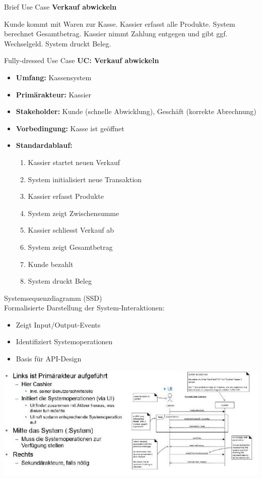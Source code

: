 \begin{example2}{Brief Use Case}
\textbf{Verkauf abwickeln}

Kunde kommt mit Waren zur Kasse. Kassier erfasst alle Produkte. System berechnet Gesamtbetrag. Kassier nimmt Zahlung entgegen und gibt ggf. Wechselgeld. System druckt Beleg.
\end{example2}

\begin{example2}{Fully-dressed Use Case}
\textbf{UC: Verkauf abwickeln}
\begin{itemize}
    \item \textbf{Umfang:} Kassensystem
    \item \textbf{Primärakteur:} Kassier
    \item \textbf{Stakeholder:} Kunde (schnelle Abwicklung), Geschäft (korrekte Abrechnung)
    \item \textbf{Vorbedingung:} Kasse ist geöffnet
    \item \textbf{Standardablauf:}
    \begin{enumerate}
        \item Kassier startet neuen Verkauf
        \item System initialisiert neue Transaktion
        \item Kassier erfasst Produkte
        \item System zeigt Zwischensumme
        \item Kassier schliesst Verkauf ab
        \item System zeigt Gesamtbetrag
        \item Kunde bezahlt
        \item System druckt Beleg
    \end{enumerate}
\end{itemize}
\end{example2}

\begin{concept}{Systemsequenzdiagramm (SSD)}\\
Formalisierte Darstellung der System-Interaktionen:
\begin{itemize}
    \item Zeigt Input/Output-Events
    \item Identifiziert Systemoperationen
    \item Basis für API-Design
\end{itemize}
\includegraphics[width=\linewidth]{images/2024_12_29_0d1d7b5551ea1b4b41bdg-06}
\end{concept}

